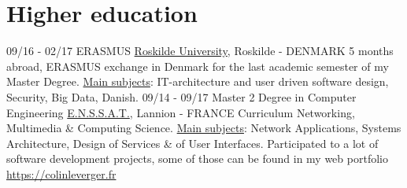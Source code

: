 \documentclass[]{friggeri-cv}
\begin{document}
\section{Higher education}
\begin{entrylist}
  \entry
    {09/16 - 02/17}
    {ERASMUS}
    {\href{http://www.ruc.dk/en/}{Roskilde University}, Roskilde - DENMARK}
    {5 months abroad, ERASMUS exchange in Denmark for the last academic semester of my Master Degree. \underline{Main subjects}: IT-architecture and user driven software design, Security, Big Data, Danish.}
  \entry
    {09/14 - 09/17}
    {Master 2 Degree in Computer Engineering}
    {\href{http://www.enssat.fr}{E.N.S.S.A.T.}, Lannion - FRANCE}
    {Curriculum Networking, Multimedia \& Computing Science. \underline{Main subjects}: Network Applications, Systems Architecture, Design of Services \& of User Interfaces. Participated to a lot of software development projects, some of those can be found in my web portfolio \href{https://colinleverger.fr}{https://colinleverger.fr}}
\end{entrylist}

\end{document}
